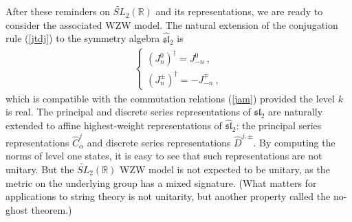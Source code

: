 \documentclass[12pt,a4paper,notitlepage]{report}
\numberwithin{equation}{section}
\theoremstyle{break}
\begin{document}
After these reminders on $\widetilde{SL}_2(\mathbb{R})$ and its representations, we are ready to consider the associated WZW model. 
The natural extension of the conjugation rule (\ref{jtdj}) to the symmetry algebra $\widehat{\mathfrak{sl}}_2$ is
\begin{align}
 \left\{\begin{array}{l} (J_n^0)^\dagger = J_{-n}^0\ , \\
         (J_n^\pm)^\dagger = -J_{-n}^\mp \ ,
        \end{array}
\right.
\end{align}
which is compatible with the commutation relations (\ref{jam}) provided the level $k$ is real. The principal and discrete series representations of $\mathfrak{sl}_2$ are naturally extended to affine highest-weight representations of $\widehat{\mathfrak{sl}}_2$: the principal series representations $\hat{C}^j_\alpha$ and discrete series representations $\hat{D}^{j,\pm}$. By computing the norms of level one states, it is easy to see that such representations are not unitary. But the $\widetilde{SL}_2(\mathbb{R})$ WZW model is not expected to be unitary, as the metric on the underlying group has a mixed signature. (What matters for applications to string theory is not unitarity, but another property called the no-ghost theorem.) 
\end{document}
